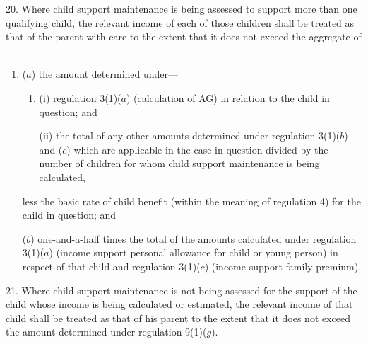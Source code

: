 \documentclass[12pt,a4paper]{article}
\begin{document}
\medskip

20.  Where child support maintenance is being assessed to support more than one qualifying child, the relevant income of each of those children shall be treated as that of the parent with care to the extent that it does not exceed the aggregate of—
\begin{enumerate}\item[]
($a$) the amount determined under—
\begin{enumerate}\item[]
(i) regulation 3(1)($a$) (calculation of AG) in relation to the child in question; and

(ii) the total of any other amounts determined under regulation 3(1)($b$) 
and ($c$)  %
which are applicable in the case in question divided by the number of children for whom child support maintenance is being calculated,
\end{enumerate}
less the basic rate of child benefit (within the meaning of regulation 4) for the child in question; and

($b$) 
one-and-a-half times  %
the total of the amounts calculated under regulation 3(1)($a$) (income support personal allowance for child or young person) in respect of that child and regulation 
3(1)($c$)  %
(income support family premium).
\end{enumerate}


\medskip

21.  Where child support maintenance is not being assessed for the support of the child whose income is being calculated or estimated, the relevant income of that child shall be treated as that of his parent to the extent that it does not exceed the amount determined under regulation 9(1)($g$).
\end{document}
